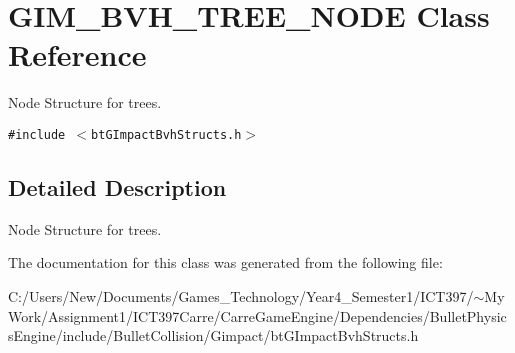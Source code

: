 \hypertarget{class_g_i_m___b_v_h___t_r_e_e___n_o_d_e}{
\section{GIM\_\-BVH\_\-TREE\_\-NODE Class Reference}
\label{class_g_i_m___b_v_h___t_r_e_e___n_o_d_e}
}
Node Structure for trees.  


{\tt \#include $<$btGImpactBvhStructs.h$>$}



\subsection{Detailed Description}
Node Structure for trees. 

The documentation for this class was generated from the following file:\begin{CompactItemize}
\item 
C:/Users/New/Documents/Games\_\-Technology/Year4\_\-Semester1/ICT397/$\sim$My Work/Assignment1/ICT397Carre/CarreGameEngine/Dependencies/BulletPhysicsEngine/include/BulletCollision/Gimpact/btGImpactBvhStructs.h\end{CompactItemize}
